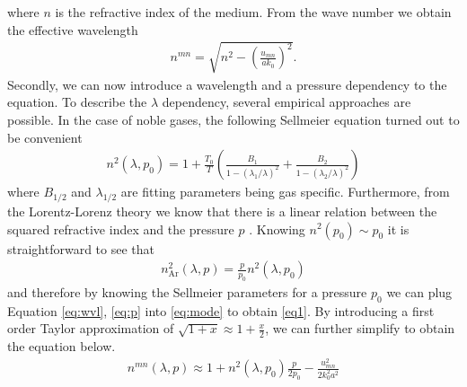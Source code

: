 \documentclass[fleqn, 10pt, twocolumn]{SelfArx}
\begin{document}
    where $n$ is the refractive index of the medium.
    From the wave number we obtain the effective wavelength
    \begin{align}
        n^{mn} = \sqrt{n^2 - \left( \frac{u_{mn}}{a k_0}\right)^2}.
        \label{eq:mode}
    \end{align}
    Secondly, we can now introduce a wavelength and a pressure dependency to the equation. To describe the $\lambda$ dependency, several empirical approaches are possible. 
    In the case of noble gases, the following Sellmeier equation turned out to be convenient \cite{Borzsonyi2008}
    \begin{align}
       n^2(\lambda, p_0)  = 1 + \frac{T_0}{T} \left(\frac{B_1}{1- (\lambda_1/\lambda)^2} + \frac{B_2}{1- (\lambda_2/\lambda)^2}  \right)
        \label{eq:wvl}
    \end{align}
    where $B_{1/2}$ and $\lambda_{1/2}$ are fitting parameters being gas specific.
    Furthermore, from the Lorentz-Lorenz theory
    we know that there is a linear relation between the squared refractive index and the pressure $p$ \cite{Borzsonyi2008}.
    Knowing $n^2(p_0) \sim p_0$ it is straightforward to see that
    \begin{align}
        n_{\text{Ar}}^2(\lambda, p) = \frac{p}{p_0} n^2(\lambda, p_0)
        \label{eq:p}
    \end{align}
    and therefore by knowing the Sellmeier parameters for a pressure $p_0$ we can plug Equation \ref{eq:wvl}, \ref{eq:p} into \ref{eq:mode} to obtain \eqref{eq1}. 
    By introducing a first order Taylor approximation of $\sqrt{1+x} \approx 1 + \frac{x}{2}$, we can further simplify to obtain the equation below.
    \begin{align}
        n^{mn}(\lambda, p) \approx 1 + n^2(\lambda, p_0) \frac{p}{2p_0} -  \frac{u_{mn}^2}{2 k_0^2 a^2}
        \label{eq1a}
    \end{align}
\end{document}
